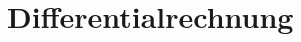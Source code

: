 \documentclass[../main.tex]{subfiles}
\begin{document}
\chapter{Differentialrechnung}\label{chp:differential}
\end{document}

